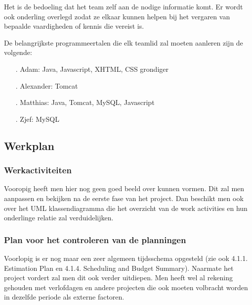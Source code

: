 \documentclass{article}
\begin{document}
Het is de bedoeling dat het team zelf aan de nodige informatie komt. Er wordt ook onderling overlegd zodat ze elkaar kunnen helpen bij het vergaren van bepaalde vaardigheden of kennis die vereist is.

De belangrijkste programmeertalen die elk teamlid zal moeten aanleren zijn de volgende:

\begin{itemize}
\item[.] Adam: Java, Javascript, XHTML, CSS grondiger \\[-5mm]
\item[.] Alexander: Tomcat \\[-5mm]
\item[.] Matthias: Java, Tomcat, MySQL, Javascript \\[-5mm]
\item[.] Zjef: MySQL \\[-5mm]
\end{itemize}

\subsection{Werkplan}

\subsubsection{Werkactiviteiten}

Vooropig heeft men hier nog geen goed beeld over kunnen vormen. Dit zal men aanpassen en bekijken na de eerste fase van het project. Dan beschikt men ook over het UML klassendiagramma die het overzicht van de work activities en hun onderlinge relatie zal verduidelijken.

\subsubsection{Plan voor het controleren van de planningen}

Voorlopig is er nog maar een zeer algemeen tijdsschema opgesteld (zie ook 4.1.1. Estimation Plan en 4.1.4. Scheduling and Budget Summary). Naarmate het project vordert zal men dit ook verder uitdiepen. Men heeft wel al rekening gehouden met verlofdagen en andere projecten die ook moeten volbracht worden in dezelfde periode als externe factoren.

\end{document}
